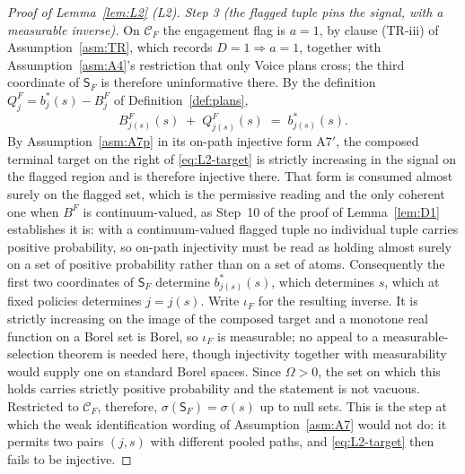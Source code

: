 \documentclass[11pt]{article}
\newcommand{\Sfl}{\mathsf{S}_F}
\begin{document}
\begin{proof}[Proof of Lemma~\ref{lem:L2} (L2)]
\emph{Step 3 (the flagged tuple pins the signal, with a measurable inverse).} On $\mathcal C_F$ the
engagement flag is $a=1$, by clause (TR-iii) of Assumption~\ref{asm:TR}, which records
$D = 1 \Rightarrow a = 1$, together with Assumption~\ref{asm:A4}'s restriction that only Voice plans
cross; the third coordinate of $\Sfl$ is therefore uninformative there. By the definition
$Q_j^F = b_j^*(s) - B_j^F$ of Definition~\ref{def:plans},
\begin{equation}
\label{eq:L2-target}
B^F_{j(s)}(s) \;+\; Q^F_{j(s)}(s) \;=\; b^*_{j(s)}(s).
\end{equation}
By Assumption~\ref{asm:A7p} in its on-path injective form A7$'$, the composed terminal target on the
right of \eqref{eq:L2-target} is strictly increasing in the signal on the flagged region and is
therefore injective there. That form is consumed almost surely on the flagged set, which is the
permissive reading and the only coherent one when $B^F$ is continuum-valued, as Step~10 of the proof
of Lemma~\ref{lem:D1} establishes it is: with a continuum-valued flagged tuple no individual tuple
carries positive probability, so on-path injectivity must be read as holding almost surely on a set
of positive probability rather than on a set of atoms. Consequently the first two coordinates of
$\Sfl$ determine $b^*_{j(s)}(s)$, which determines $s$, which at fixed policies determines
$j = j(s)$. Write $\iota_F$ for the resulting inverse. It is strictly increasing on the image of the
composed target and a monotone real function on a Borel set is Borel, so $\iota_F$ is measurable; no
appeal to a measurable-selection theorem is needed here, though injectivity together with
measurability would supply one on standard Borel spaces. Since $\Omega > 0$, the set on which this
holds carries strictly positive probability and the statement is not vacuous. Restricted to
$\mathcal C_F$, therefore, $\sigma(\Sfl) = \sigma(s)$ up to null sets. This is the step at which the
weak identification wording of Assumption~\ref{asm:A7} would not do: it permits two pairs $(j,s)$
with different pooled paths, and \eqref{eq:L2-target} then fails to be injective.


\end{proof}
\end{document}
